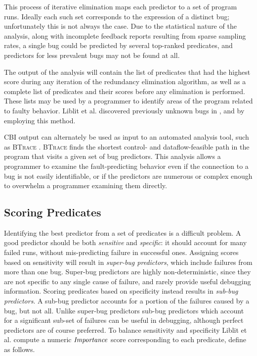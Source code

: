 This process of iterative elimination maps each predictor to a set of program runs.  Ideally each such set corresponds to the expression of a distinct bug; unfortunately this is not always the case.  Due to the statistical nature of the analysis, along with incomplete feedback reports resulting from sparse sampling rates, a single bug could be predicted by several top-ranked predicates, and predictors for less prevalent bugs may not be found at all.

The output of the analysis will contain the list of predicates that had the highest score during any iteration of the redundancy elimination algorithm, as well as a complete list of predicates and their scores before any elimination is performed.  These lists may be used by a programmer to identify areas of the program related to faulty behavior.  Liblit et al. discovered previously unknown bugs in  \cite{Liblit:2003:BIRPS},  \cite{Liblit:2005:SSBI} and  \cite{Liblit:2005:SSBI} by employing this method.

CBI output can alternately be used as input to an automated analysis tool, such as \textsc{BTrace} \cite{Lal:2006:POPAD}. \textsc{BTrace} finds the shortest control- and dataflow-feasible path in the program that visits a given set of bug predictors.  This analysis allows a programmer to examine the fault-predicting behavior even if the connection to a bug is not easily identifiable, or if the predictors are numerous or complex enough to overwhelm a programmer examining them directly.

\subsection{Scoring Predicates}
\label{sec-scoring}
Identifying the best predictor from a set of predicates is a difficult problem.  A good predictor should be both \emph{sensitive} and \emph{specific}: it should account for many failed runs, without mis-predicting failure in successful ones.  Assigning scores based on sensitivity will result in \emph{super-bug predictors}, which include failures from more than one bug.  Super-bug predictors are highly non-deterministic, since they are not specific to any single cause of failure, and rarely provide useful debugging information.  Scoring predicates based on specificity instead results in \emph{sub-bug predictors}.  A sub-bug predictor accounts for a portion of the failures caused by a bug, but not all.  Unlike super-bug predictors sub-bug predictors which account for a significant sub-set of failures can be useful in debugging, although perfect predictors are of course preferred.  To balance sensitivity and specificity Liblit et al. \cite{Liblit:2005:SSBI} compute a numeric $\mathit{Importance}$ score corresponding to each predicate, define as follows.


